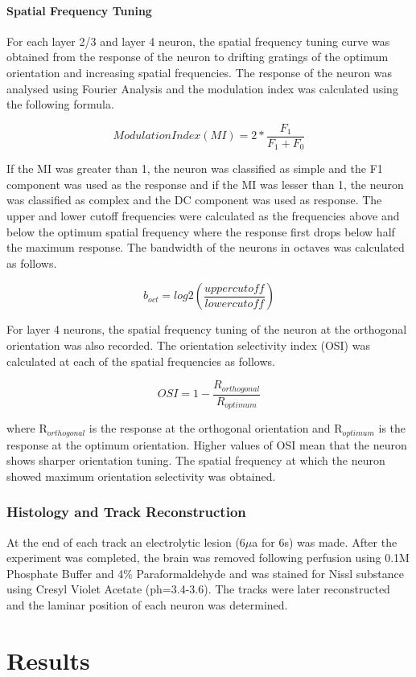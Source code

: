 \paragraph{Spatial Frequency Tuning}

For each layer 2/3 and layer 4 neuron, the spatial frequency tuning curve was obtained from the response of the neuron to drifting gratings of the optimum orientation and increasing spatial frequencies. The response of the neuron was analysed using Fourier Analysis and the modulation index was calculated using the following formula.

\[Modulation Index (MI)= 2*\frac{F_1}{F_1+F_0}\]

If the MI was greater than 1, the neuron was classified as simple and the F1 component was used as the response and if the MI was lesser than 1, the neuron was classified as complex and the DC component was used as response. The upper and lower cutoff frequencies were calculated as the frequencies above and below the optimum spatial frequency where the response first drops below half the maximum response.  The bandwidth of the neurons in octaves was calculated as follows.

\[b_{oct}= log2(\frac{upper cutoff}{lower cutoff})\]

For layer 4 neurons, the spatial frequency tuning of the neuron at the orthogonal orientation was also recorded. The orientation selectivity index (OSI) was calculated at each of the spatial frequencies as follows.

\[OSI= 1-\frac{R_{orthogonal}}{R_{optimum}}\]

where R$_{orthogonal}$ is the response at the orthogonal orientation and R$_{optimum}$ is the response at the optimum orientation. Higher values of OSI mean that the neuron shows sharper orientation tuning. The spatial frequency at which the neuron showed maximum orientation selectivity was obtained.
\subsubsection{Histology and Track Reconstruction}

At the end of each track an electrolytic lesion (6$\mu$a for 6s) was made. After the experiment was completed, the brain was removed following perfusion using 0.1M Phosphate Buffer and 4\% Paraformaldehyde and was stained for Nissl substance using Cresyl Violet Acetate (ph=3.4-3.6). The tracks were later reconstructed and the laminar position of each neuron was determined.
\section{Results}

